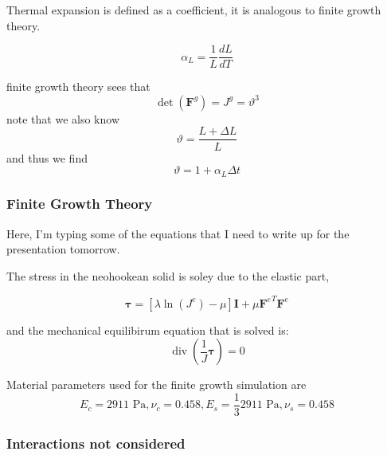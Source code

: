 \documentclass{article}
\begin{document}
Thermal expansion is defined as a coefficient, it is analogous to finite growth theory.

\begin{equation}
    \alpha_L = \frac{1}{L}\frac{dL}{dT}
\end{equation}

finite growth theory sees that
\begin{equation}
    \operatorname{det}(\bm{F}^g) = J^g = \vartheta ^ 3
\end{equation}
note that we also know
\begin{equation}
    \vartheta = \frac{L + \Delta L}{L}
\end{equation}
and thus we find
\begin{equation}
    \vartheta = 1 + \alpha_L \Delta t
\end{equation}

\subsubsection{Finite Growth Theory}

Here, I'm typing some of the equations that I need to write up for the presentation tomorrow.

The stress in the neohookean solid is soley due to the elastic part,

\begin{equation}
    \bm{\tau} = [\lambda \operatorname{ln} (J^e) - \mu]\bm{I} + \mu {\bm{F}^e}^T \bm{F}^e
\end{equation}

and the mechanical equilibirum equation that is solved is:
\begin{equation}
    \operatorname{div}\left ( \frac{1}{J} \bm{\tau} \right ) = 0
\end{equation}

Material parameters used for the finite growth simulation are
\begin{equation}
    E_c=2911 \text{ Pa}, \nu_c=0.458, E_s=\frac{1}{3}2911 \text{ Pa}, \nu_s=0.458
\end{equation}


\subsubsection{Interactions not considered}

\end{document}
